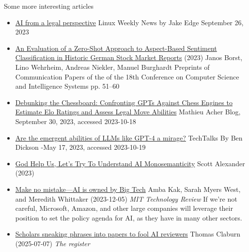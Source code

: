 \begin{frame}[allowframebreaks]{Some more interesting articles}

  \begin{itemize}
  \item \href{https://lwn.net/Articles/945504/}{AI from a legal perspective} Linux Weekly News by Jake Edge September 26, 2023

  \item \href{https://annals-csis.org/proceedings/2023/pliks/3725.pdf}{An Evaluation of a Zero-Shot Approach to
Aspect-Based Sentiment Classification in Historic
German Stock Market Reports} (2023) Janos Borst, Lino Wehrheim, Andreas Niekler, Manuel Burghardt
Preprints of Communication Papers of the of the 18th Conference on Computer
Science and Intelligence Systems pp. 51–60
\item 
\href{https://blog.mathieuacher.com/GPTsChessEloRatingLegalMoves/}{Debunking the Chessboard: Confronting GPTs Against Chess Engines to Estimate Elo Ratings and Assess Legal Move Abilities} 
Mathieu Acher Blog, September 30, 2023, accessed 2023-10-18
\item 
\href{https://bdtechtalks.com/2023/05/17/llm-emergent-abilities-mirage/}{Are the emergent abilities of LLMs like GPT-4 a mirage?} TechTalks
By Ben Dickson -May 17, 2023, accessed 2023-10-19
\item 
\href{https://www.astralcodexten.com/p/god-help-us-lets-try-to-understand}{God Help Us, Let's Try To Understand AI Monosemanticity} Scott Alexander (2023)
\item 
\href{https://www.technologyreview.com/2023/12/05/1084393/make-no-mistake-ai-is-owned-by-big-tech/amp/}{Make no mistake—AI is owned by Big Tech}  Amba Kak, Sarah Myers West, and Meredith Whittaker (2023-12-05) \textit{MIT Technology Review}
If we’re not careful, Microsoft, Amazon, and other large companies will leverage their position to set the policy agenda for AI, as they have in many other sectors.
\item \href{https://www.theregister.com/2025/07/07/scholars_try_to_fool_llm_reviewers/}{Scholars sneaking phrases into papers to fool AI reviewers} Thomas Claburn (2025-07-07) \textit{The register} 

\end{itemize}
\end{frame}



